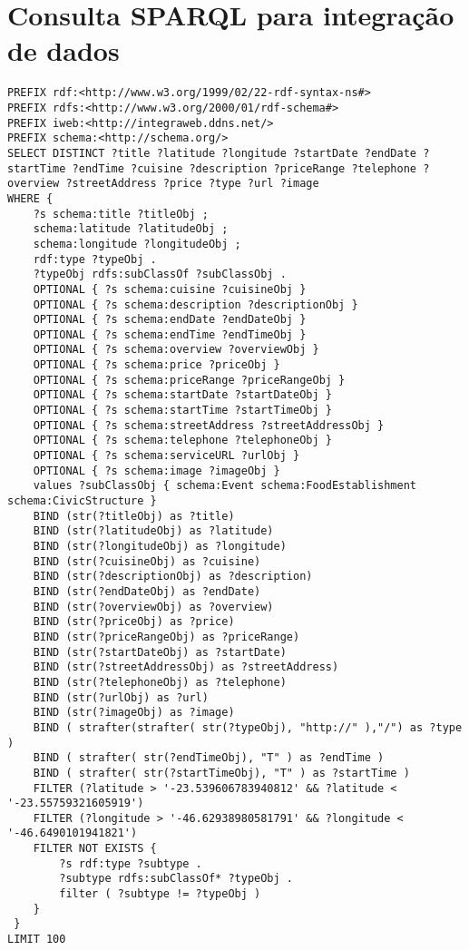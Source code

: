\chapter{Consulta SPARQL para integração de dados}
\label{ape:sparql-marco-zero}
\begin{lstlisting}[language=SPARQL,basicstyle=\ttfamily\small]
PREFIX rdf:<http://www.w3.org/1999/02/22-rdf-syntax-ns#>
PREFIX rdfs:<http://www.w3.org/2000/01/rdf-schema#>
PREFIX iweb:<http://integraweb.ddns.net/>
PREFIX schema:<http://schema.org/>
SELECT DISTINCT ?title ?latitude ?longitude ?startDate ?endDate ?startTime ?endTime ?cuisine ?description ?priceRange ?telephone ?overview ?streetAddress ?price ?type ?url ?image 
WHERE {
	?s schema:title ?titleObj ;
	schema:latitude ?latitudeObj ;
	schema:longitude ?longitudeObj ;
	rdf:type ?typeObj .
	?typeObj rdfs:subClassOf ?subClassObj .
	OPTIONAL { ?s schema:cuisine ?cuisineObj }
	OPTIONAL { ?s schema:description ?descriptionObj }
	OPTIONAL { ?s schema:endDate ?endDateObj }
	OPTIONAL { ?s schema:endTime ?endTimeObj }	
	OPTIONAL { ?s schema:overview ?overviewObj }
	OPTIONAL { ?s schema:price ?priceObj }	
	OPTIONAL { ?s schema:priceRange ?priceRangeObj }
	OPTIONAL { ?s schema:startDate ?startDateObj }
	OPTIONAL { ?s schema:startTime ?startTimeObj }
	OPTIONAL { ?s schema:streetAddress ?streetAddressObj }	
	OPTIONAL { ?s schema:telephone ?telephoneObj }
	OPTIONAL { ?s schema:serviceURL ?urlObj }
	OPTIONAL { ?s schema:image ?imageObj }
	values ?subClassObj { schema:Event schema:FoodEstablishment schema:CivicStructure } 
	BIND (str(?titleObj) as ?title)
	BIND (str(?latitudeObj) as ?latitude)
	BIND (str(?longitudeObj) as ?longitude)
	BIND (str(?cuisineObj) as ?cuisine)
	BIND (str(?descriptionObj) as ?description)
	BIND (str(?endDateObj) as ?endDate)
	BIND (str(?overviewObj) as ?overview)
	BIND (str(?priceObj) as ?price)
	BIND (str(?priceRangeObj) as ?priceRange)
	BIND (str(?startDateObj) as ?startDate)
	BIND (str(?streetAddressObj) as ?streetAddress)
	BIND (str(?telephoneObj) as ?telephone)
	BIND (str(?urlObj) as ?url)
	BIND (str(?imageObj) as ?image)
	BIND ( strafter(strafter( str(?typeObj), "http://" ),"/") as ?type )
	BIND ( strafter( str(?endTimeObj), "T" ) as ?endTime )
	BIND ( strafter( str(?startTimeObj), "T" ) as ?startTime )
	FILTER (?latitude > '-23.539606783940812' && ?latitude < '-23.55759321605919')
	FILTER (?longitude > '-46.62938980581791' && ?longitude < '-46.6490101941821')
	FILTER NOT EXISTS {
		?s rdf:type ?subtype .
		?subtype rdfs:subClassOf* ?typeObj .
		filter ( ?subtype != ?typeObj )
	}
 }
LIMIT 100
\end{lstlisting}